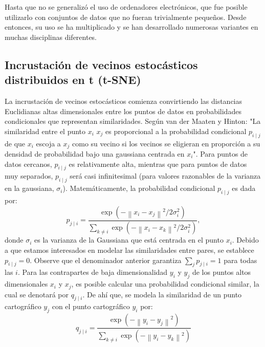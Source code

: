 \documentclass[12pt,letterpaper,oneside,openright]{book}
\begin{document}
	Hasta que no se generalizó el uso de ordenadores electrónicos, que fue posible utilizarlo con conjuntos de datos que no fueran trivialmente pequeños. Desde entonces, su uso se ha multiplicado y se han desarrollado numerosas variantes en muchas disciplinas diferentes.
	

\subsection{Incrustación de vecinos estocásticos distribuidos en t (t-SNE)}
	 La incrustación de vecinos estocásticos comienza convirtiendo las distancias Euclidianas altas dimensionales entre los puntos de datos en probabilidades condicionales que representan similaridades. Según van der Maaten y Hinton: "La similaridad entre el punto $x_i$ $x_j$ es proporcional a la probabilidad condicional $p_{i\mid j}$ de que $x_i$ escoja a $x_j$ como su vecino si los vecinos se eligieran en proporción a su densidad de probabilidad bajo una gaussiana centrada en $x_i$". Para puntos de datos cercanos, $p_{i\mid j}$ es relativamente alta, mientras que para puntos de datos muy separados, $p_{i\mid j}$ será casi infinitesimal (para valores razonables de la varianza en la gaussiana, $\sigma_i$). Matemáticamente, la probabilidad condicional $p_{i\mid j}$ es dada por: 
	 \begin{equation}
	 	\label{eq:prob_cond}
	 	p_{j \mid i}=\frac{\exp \left(-\left\|x_i-x_j\right\|^2 / 2 \sigma_i^2\right)}{\sum_{k \neq i} \exp \left(-\left\|x_i-x_k\right\|^2 / 2 \sigma_i^2\right)},
	 \end{equation}
	donde $\sigma_i$ es la varianza de la Gaussiana que está centrada en el punto $x_i$. Debido a que estamos interesados en modelar las similaridades entre pares, se establece $p_{i\mid j} = 0$. Observe que el denominador anterior garantiza $\sum_j p_{j \mid i}=1$ para todas las $i$. Para las contrapartes de baja dimensionalidad $y_i$ y $y_j$ de los puntos altos dimensionales $x_i$ y $x_j$, es posible calcular una probabilidad condicional similar, la cual se denotará por $q_{j \mid i}$. De ahí que, se modela la similaridad de un punto cartográfico $y_j$ con el punto cartográfico $y_i$ por:
	\begin{equation}
		\label{eq:prob_cond_q}
		q_{j \mid i}=\frac{\exp \left(-\left\|y_i-y_j\right\|^2\right)}{\sum_{k \neq i} \exp \left(-\left\|y_i-y_k\right\|^2\right)}
	\end{equation}
	
\end{document}
